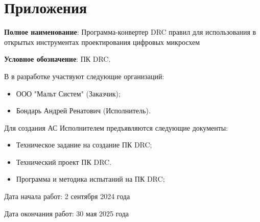 \chapter*{Приложения}







\textbf{Полное наименование}:
Программа-конвертер DRC правил для использования
в открытых инструментах проектирования цифровых микросхем

\textbf{Условное обозначение}: ПК DRC.


В в разработке участвуют следующие организаций:

\begin{itemize}
	\item ООО "Мальт Систем" (Заказчик);
	\item Бондарь Андрей Ренатович (Исполнитель).
\end{itemize}


Для создания АС Исполнителем предъявляются следующие документы:

\begin{itemize}
	\item Техническое задание на создание ПК DRC;
	\item Технический проект ПК DRC.
	\item Программа и методика испытаний на ПК DRC;
\end{itemize}


Дата начала работ: 2 сентября 2024 года

Дата окончания работ: 30 мая 2025 года


